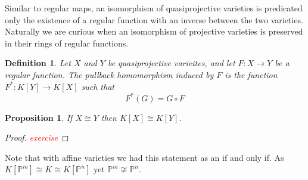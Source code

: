 \documentclass[40pt]{article}
\newtheorem{definition}{Definition}[section]
\newcommand{\Proj}{\mathbb{P}}
\newcommand{\note}[1]{\textcolor{red}{\emph{#1}}}
\newtheorem{proposition}{Proposition}[section]
\theoremstyle{remark}
\begin{document}
				Similar to regular maps, an isomorphism of quasiprojective varieties is predicated only the existence of a regular function with an inverse between the two varieties. Naturally we are curious when an isomorphism of projective varieties is preserved in their rings of regular functions. 
				\begin{definition}
					Let $X$ and $Y$ be quasiprojective varieites, and let $F: X \to Y$ be a regular function. The pullback homomorphism induced by $F$ is the function $F^* : K[Y] \to K[X]$ such that 
					\[
					F^*(G) = G \circ F
					\]
				\end{definition}
				\begin{proposition}
					If $X \cong Y$ then $K[X] \cong K[Y]$.
				\end{proposition}
				\begin{proof}
					\note{exercise}
				\end{proof}
				Note that with affine varieties we had this statement as an if and only if. As $K[\Proj^m] \cong K \cong K[\Proj^n]$ yet $\Proj^m \not \cong \Proj^n$. 
\end{document}
